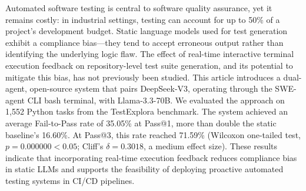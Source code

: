 Automated software testing is central to software quality assurance, yet it remains costly: in industrial settings, testing can account for up to 50\% of a project's development budget. Static language models used for test generation exhibit a compliance bias---they tend to accept erroneous output rather than identifying the underlying logic flaw. The effect of real-time interactive terminal execution feedback on repository-level test suite generation, and its potential to mitigate this bias, has not previously been studied. This article introduces a dual-agent, open-source system that pairs DeepSeek-V3, operating through the SWE-agent CLI bash terminal, with Llama-3.3-70B. We evaluated the approach on 1,552 Python tasks from the TestExplora benchmark. The system achieved an average Fail-to-Pass rate of 35.05\% at Pass@1, more than double the static baseline's 16.60\%. At Pass@3, this rate reached 71.59\% (Wilcoxon one-tailed test, $p = 0.000000 < 0.05$; Cliff's $\delta = 0.3018$, a medium effect size). These results indicate that incorporating real-time execution feedback reduces compliance bias in static LLMs and supports the feasibility of deploying proactive automated testing systems in CI/CD pipelines.
